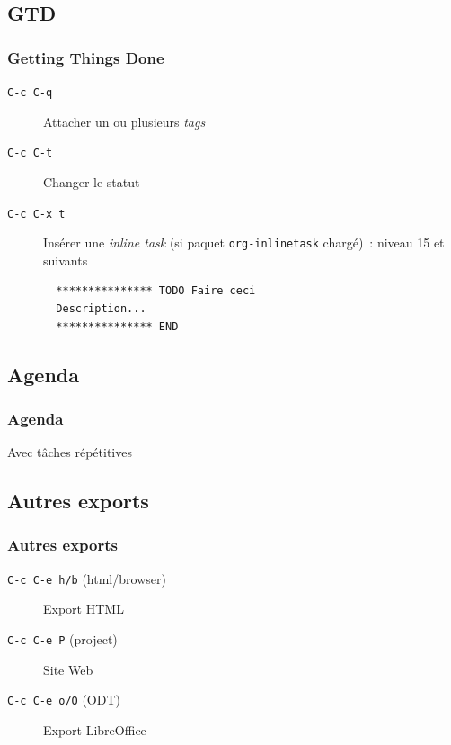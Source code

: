 \documentclass[presentation,t,hideothersubsections]{beamer}
\begin{document}
\subsection{GTD}
\label{sec-5-3}
\begin{frame}[fragile]
\frametitle{Getting Things Done}
\label{sec-5-3-1}


\begin{description}
\item[\texttt{C-c C-q}] Attacher un ou plusieurs \emph{tags}
\item[\texttt{C-c C-t}] Changer le statut
\item[\texttt{C-c C-x t}] Insérer une \emph{inline task} (si paquet \texttt{org-inlinetask} chargé) :
  niveau 15 et suivants


\lstset{language=org}
\begin{lstlisting}
  *************** TODO Faire ceci
  Description...
  *************** END
\end{lstlisting}
\end{description}
\end{frame}
\subsection{Agenda}
\label{sec-5-4}
\begin{frame}
\frametitle{Agenda}
\label{sec-5-4-1}


Avec tâches répétitives
\end{frame}
\subsection{Autres exports}
\label{sec-5-5}
\begin{frame}
\frametitle{Autres exports}
\label{sec-5-5-1}


\begin{description}
\item[\texttt{C-c C-e h/b} (html/browser)] Export HTML
\item[\texttt{C-c C-e P} (project)] Site Web
\item[\texttt{C-c C-e o/O} (ODT)] Export LibreOffice
\end{description}
\end{frame}
\end{document}

